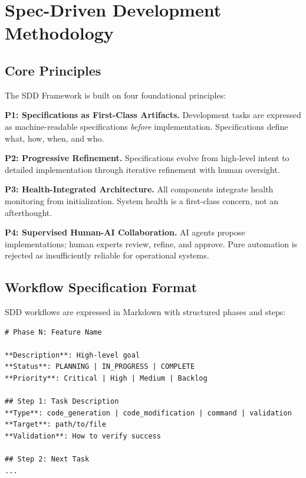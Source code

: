 \documentclass[11pt,letterpaper]{article}
\newcommand{\sdd}{\textsc{SDD}}
\begin{document}
\section{Spec-Driven Development Methodology}

\subsection{Core Principles}

The \sdd{} Framework is built on four foundational principles:

\textbf{P1: Specifications as First-Class Artifacts.} Development tasks are expressed as machine-readable specifications \textit{before} implementation. Specifications define what, how, when, and who.

\textbf{P2: Progressive Refinement.} Specifications evolve from high-level intent to detailed implementation through iterative refinement with human oversight.

\textbf{P3: Health-Integrated Architecture.} All components integrate health monitoring from initialization. System health is a first-class concern, not an afterthought.

\textbf{P4: Supervised Human-AI Collaboration.} AI agents propose implementations; human experts review, refine, and approve. Pure automation is rejected as insufficiently reliable for operational systems.

\subsection{Workflow Specification Format}

SDD workflows are expressed in Markdown with structured phases and steps:

\begin{lstlisting}[style=code, caption={SDD Workflow Structure}]
# Phase N: Feature Name

**Description**: High-level goal
**Status**: PLANNING | IN_PROGRESS | COMPLETE
**Priority**: Critical | High | Medium | Backlog

## Step 1: Task Description
**Type**: code_generation | code_modification | command | validation
**Target**: path/to/file
**Validation**: How to verify success

## Step 2: Next Task
...
\end{lstlisting}
\end{document}
